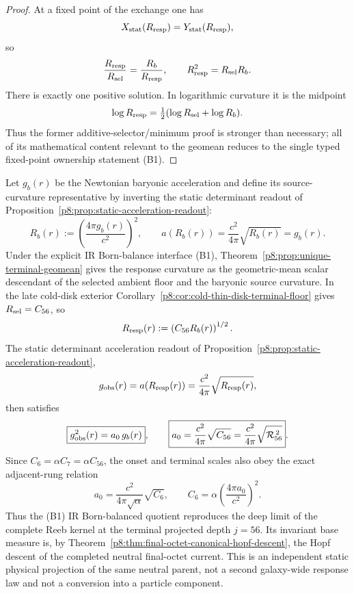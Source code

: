 \documentclass[12pt,a4paper]{article}
\begin{document}
\begin{proof}
At a fixed point of the exchange one has
\[
X_{\rm stat}(R_{\rm resp})=Y_{\rm stat}(R_{\rm resp}),
\]
so
\[
\frac{R_{\rm resp}}{R_{\rm sel}}
=\frac{R_b}{R_{\rm resp}},
\qquad
R_{\rm resp}^2=R_{\rm sel}R_b.
\]
There is exactly one positive solution.  In logarithmic curvature it is the
midpoint
\[
\log R_{\rm resp}=\tfrac12(\log R_{\rm sel}+\log R_b).
\]
Thus the former additive-selector/minimum proof is stronger than necessary;
all of its mathematical content relevant to the geomean reduces to the single
typed fixed-point ownership statement (B1).
\end{proof}

\begin{theorem}
\label{p8:thm:terminal-rar-readout}
Let \(g_b(r)\) be the Newtonian baryonic acceleration and define its source-curvature representative by inverting the static determinant readout of Proposition~\ref{p8:prop:static-acceleration-readout}:
\begin{equation}
\label{p8:eq:baryon-source-curvature}
R_b(r):=\left(\frac{4\pi g_b(r)}{c^2}\right)^2,
\qquad
a(R_b(r))=\frac{c^2}{4\pi}\sqrt{R_b(r)}=g_b(r).
\end{equation}
Under the explicit IR Born-balance interface (B1), Theorem~\ref{p8:prop:unique-terminal-geomean} gives the response curvature as the geometric-mean scalar descendant of the selected ambient floor and the baryonic source curvature.  In the late cold-disk exterior Corollary~\ref{p8:cor:cold-thin-disk-terminal-floor} gives \(R_{\rm sel}=C_{56}\), so
\begin{equation}
\label{p8:eq:response-curvature-geomean}
R_{\rm resp}(r):=\left(C_{56}R_b(r)\right)^{1/2}.
\end{equation}
The static determinant acceleration readout of Proposition~\ref{p8:prop:static-acceleration-readout},
\begin{equation}
\label{p8:eq:acceleration-readout}
g_{\rm obs}(r)=a(R_{\rm resp}(r))
=\frac{c^2}{4\pi}\sqrt{R_{\rm resp}(r)},
\end{equation}
then satisfies
\begin{equation}
\label{p8:eq:deep-rar-derived}
\boxed{g_{\rm obs}^2(r)=a_0\,g_b(r)},
\qquad
\boxed{a_0=\frac{c^2}{4\pi}\sqrt{C_{56}}
=\frac{c^2}{4\pi}\sqrt{\mathcal R_{56}^{\,2}}}.
\end{equation}
Since \(C_6=\alpha C_7=\alpha C_{56}\), the onset and terminal scales also
obey the exact adjacent-rung relation
\begin{equation}
 \label{p8:eq:c6-terminal-rar-scale-link}
 \boxed{
 a_0=\frac{c^2}{4\pi\sqrt\alpha}\sqrt{C_6},
 \qquad
 C_6=\alpha\left(\frac{4\pi a_0}{c^2}\right)^2.}
\end{equation}
Thus the (B1) IR Born-balanced quotient reproduces the deep limit of the
complete Reeb kernel at the terminal projected depth $j=56$.  Its invariant
base measure is, by
Theorem~\ref{p8:thm:final-octet-canonical-hopf-descent}, the Hopf descent of
the completed neutral final-octet current.  This is an independent static
physical projection of the same neutral parent, not a second galaxy-wide
response law and not a conversion into a particle component.
\end{theorem}
\end{document}
